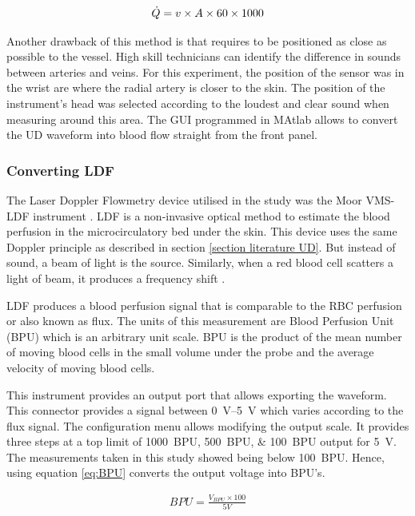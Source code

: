 \begin{align}
	\label{eq:flow_l/min}
	\dot{Q} = v \times A \times 60 \times 1000 \tagaddtext{[\si{\cubic\meter\per\second}]}
\end{align}

Another drawback of this method is that requires to be positioned as close as possible to the vessel. High skill technicians can identify the difference in sounds between arteries and veins. For this experiment, the position of the sensor was in the wrist are where the radial artery is closer to the skin. The position of the instrument's head was selected according to the loudest and clear sound when measuring around this area. The GUI programmed in MAtlab allows to convert the UD waveform into blood flow straight from the front panel.

\subsubsection{Converting LDF}
\label{section:ldf}
The Laser Doppler Flowmetry device utilised in the study was the Moor VMS-LDF instrument \cite{moor:LDF2}. LDF is a non-invasive optical method to estimate the blood perfusion in the microcirculatory bed under the skin. This device uses the same Doppler principle as described in section \ref{section literature UD}. But instead of sound, a beam of light is the source. Similarly, when a red blood cell scatters a light of beam, it produces a frequency shift \cite{fredriksson2007laser}. 

LDF produces a blood perfusion signal that is comparable to the RBC perfusion or also known as flux. The units of this measurement are Blood Perfusion Unit (BPU) which is an arbitrary unit scale. BPU is the product of the mean number of moving blood cells in the small volume under the probe and the average velocity of moving blood cells. 

This instrument provides an output port that allows exporting the waveform. This connector provides a signal between \SIrange{0}{5}{\volt} which varies according to the flux signal. The configuration menu allows modifying the output scale. It provides three steps at a top limit of \SIlist{1000;500;100}{BPU} output for \SI{5}{\volt}. The measurements taken in this study showed being below \SI{100}{BPU}. Hence, using equation \ref{eq:BPU} converts the output voltage into BPU's.

\begin{align}
	\label{eq:BPU}
	BPU = \frac{V_{BPU} \times 100}{5 V}
\end{align}

